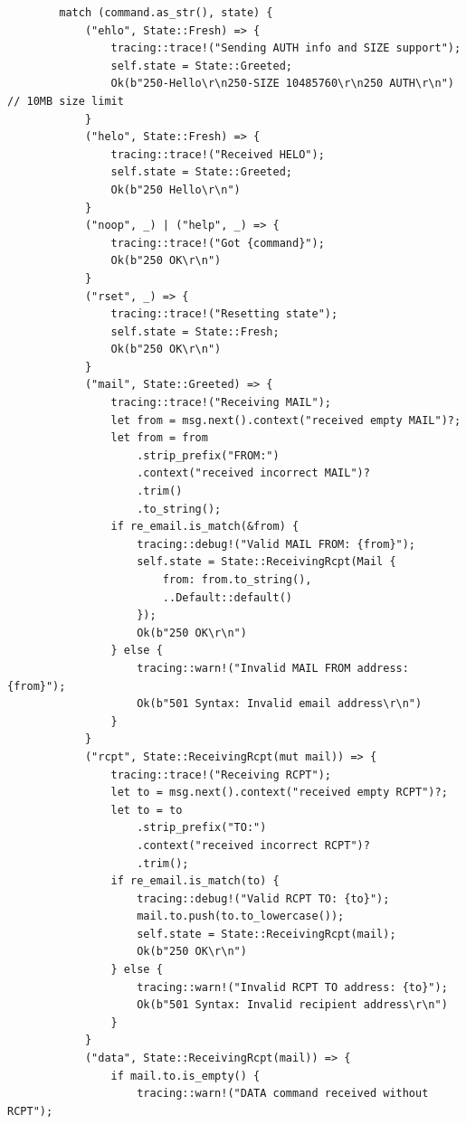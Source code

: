 \documentclass[12pt, a4paper]{article}
\begin{document}
\begin{enumerate}
\begin{verbatim}
        match (command.as_str(), state) {
            ("ehlo", State::Fresh) => {
                tracing::trace!("Sending AUTH info and SIZE support");
                self.state = State::Greeted;
                Ok(b"250-Hello\r\n250-SIZE 10485760\r\n250 AUTH\r\n") // 10MB size limit
            }
            ("helo", State::Fresh) => {
                tracing::trace!("Received HELO");
                self.state = State::Greeted;
                Ok(b"250 Hello\r\n")
            }
            ("noop", _) | ("help", _) => {
                tracing::trace!("Got {command}");
                Ok(b"250 OK\r\n")
            }
            ("rset", _) => {
                tracing::trace!("Resetting state");
                self.state = State::Fresh;
                Ok(b"250 OK\r\n")
            }
            ("mail", State::Greeted) => {
                tracing::trace!("Receiving MAIL");
                let from = msg.next().context("received empty MAIL")?;
                let from = from
                    .strip_prefix("FROM:")
                    .context("received incorrect MAIL")?
                    .trim()
                    .to_string();
                if re_email.is_match(&from) {
                    tracing::debug!("Valid MAIL FROM: {from}");
                    self.state = State::ReceivingRcpt(Mail {
                        from: from.to_string(),
                        ..Default::default()
                    });
                    Ok(b"250 OK\r\n")
                } else {
                    tracing::warn!("Invalid MAIL FROM address: {from}");
                    Ok(b"501 Syntax: Invalid email address\r\n")
                }
            }
            ("rcpt", State::ReceivingRcpt(mut mail)) => {
                tracing::trace!("Receiving RCPT");
                let to = msg.next().context("received empty RCPT")?;
                let to = to
                    .strip_prefix("TO:")
                    .context("received incorrect RCPT")?
                    .trim();
                if re_email.is_match(to) {
                    tracing::debug!("Valid RCPT TO: {to}");
                    mail.to.push(to.to_lowercase());
                    self.state = State::ReceivingRcpt(mail);
                    Ok(b"250 OK\r\n")
                } else {
                    tracing::warn!("Invalid RCPT TO address: {to}");
                    Ok(b"501 Syntax: Invalid recipient address\r\n")
                }
            }
            ("data", State::ReceivingRcpt(mail)) => {
                if mail.to.is_empty() {
                    tracing::warn!("DATA command received without RCPT");

\end{verbatim}
\end{enumerate}
\end{document}
